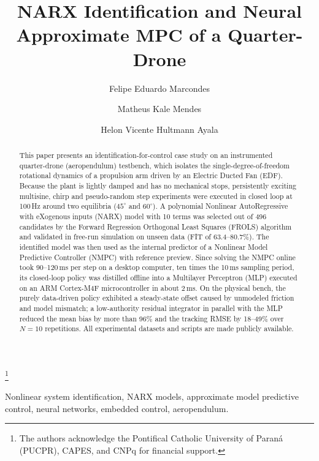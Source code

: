 \documentclass{ifacconf}
\newif\ifinstr \instrfalse
\newcommand{\instr}[1]{%
  \ifinstr
    \par\noindent
    \fcolorbox{orange!80!black}{yellow!20}{%
      \parbox{\dimexpr\linewidth-2\fboxsep-2\fboxrule}{%
        \small\sffamily\color{orange!40!black}%
        \textbf{Instrução:} #1}}%
    \par\medskip
  \fi}
\begin{document}
\begin{frontmatter}

\title{NARX Identification and Neural Approximate MPC of a Quarter-Drone} 

\thanks[footnoteinfo]{The authors acknowledge the Pontifical Catholic University of Paraná (PUCPR), CAPES, and CNPq for financial support.}

\author[First]{Felipe Eduardo Marcondes} 
\author[First]{Matheus Kale Mendes} 
\author[First]{Helon Vicente Hultmann Ayala}

\address[First]{Polytechnic School, Pontifical Catholic University of Paraná (PUCPR), Curitiba, PR 80215-901, Brazil (e-mail: marcondes.felipe@pucpr.edu.br, matheus.kale@pucpr.edu.br, helon.ayala@pucpr.br).}

\begin{abstract}                %
This paper presents an identification-for-control case study on an instrumented quarter-drone (aeropendulum) testbench, which isolates the single-degree-of-freedom rotational dynamics of a propulsion arm driven by an Electric Ducted Fan (EDF). Because the plant is lightly damped and has no mechanical stops, persistently exciting multisine, chirp and pseudo-random step experiments were executed in closed loop at 100\,Hz around two equilibria ($45^\circ$ and $60^\circ$). A polynomial Nonlinear AutoRegressive with eXogenous inputs (NARX) model with 10 terms was selected out of 496 candidates by the Forward Regression Orthogonal Least Squares (FROLS) algorithm and validated in free-run simulation on unseen data (FIT of 63.4--80.7\%). The identified model was then used as the internal predictor of a Nonlinear Model Predictive Controller (NMPC) with reference preview. Since solving the NMPC online took 90--120\,ms per step on a desktop computer, ten times the 10\,ms sampling period, its closed-loop policy was distilled offline into a Multilayer Perceptron (MLP) executed on an ARM Cortex-M4F microcontroller in about 2\,ms. On the physical bench, the purely data-driven policy exhibited a steady-state offset caused by unmodeled friction and model mismatch; a low-authority residual integrator in parallel with the MLP reduced the mean bias by more than 96\% and the tracking RMSE by 18--49\% over $N=10$ repetitions. All experimental datasets and scripts are made publicly available.

\instr{preencher apenas no final.}

\end{abstract}

\begin{keyword}
Nonlinear system identification, NARX models, approximate model predictive control, neural networks, embedded control, aeropendulum.
\end{keyword}

\end{frontmatter}
\end{document}
